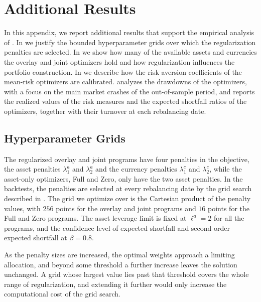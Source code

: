 \chapter{Additional Results}\label{app:additional-results}

In this appendix, we report additional results that support the empirical analysis of .
In  we justify the bounded hyperparameter grids over which the regularization
penalties are selected. In
 we show how many of the available assets and currencies the overlay and joint optimizers
hold and how regularization influences the portfolio construction. In  we describe how the risk
aversion coefficients of the mean-risk optimizers are calibrated.  analyzes the drawdowns
of the optimizers, with a focus on the main market crashes of the out-of-sample period, and
 reports the realized values of the risk measures and the expected shortfall
ratios of the optimizers, together with their turnover at each rebalancing date.

\section{Hyperparameter Grids} \label{app:hyperparameter-sensitivity}

The regularized overlay and joint programs have four penalties in the objective, the asset penalties $\lambda_1^a$ and $\lambda_2^a$ and
the currency penalties $\lambda_1^c$ and $\lambda_2^c$, while the asset-only optimizers, Full and Zero, only have the
two asset penalties. In the backtests, the penalties are selected at every rebalancing date by the grid search described in
. The grid we optimize over is the Cartesian product of the penalty values, with $256$ points for the overlay and
joint programs and $16$ points for the Full and Zero programs. The asset leverage
limit is fixed at $\ell^a = 2$ for all the programs, and the confidence level of expected shortfall and second-order expected shortfall at
$\beta = 0.8$.
 
As the penalty sizes are increased, the optimal weights approach a limiting
allocation, and beyond some threshold a further increase leaves the solution unchanged. A grid whose
largest value lies past that threshold covers the whole range of regularization, and extending it further would only
increase the computational cost of the grid search.

